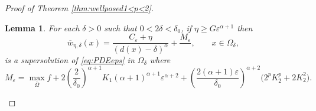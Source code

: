 \documentclass[11pt,reqno]{amsart}
\numberwithin{figure}{section}
\theoremstyle{plain}
\newtheorem{lem}[thm]{Lemma}
\theoremstyle{remark}
\numberwithin{equation}{section}
\begin{document}
\begin{appendices}
\begin{proof} [Proof of Theorem \ref{thm:wellposed1<p<2}]
\begin{lem}\label{lem:subsln} For each $\delta > 0$ such that $0<2\delta < \delta_0$, if $\eta\geq G\varepsilon^{\alpha+1}$ then
\begin{equation*}
    \overline{w}_{\eta,\delta}(x) = \frac{C_\varepsilon+\eta}{(d(x)-\delta)^\alpha} +\frac{M_\varepsilon}{ },\qquad x\in \Omega_\delta, 
\end{equation*}
is a supersolution of \eqref{eq:PDEeps} in $\Omega_\delta$ where
\begin{equation}\label{e:M_eps}
    M_\varepsilon = \max_{\overline{\Omega}} f + 2\left(\frac{2}{\delta_0}\right)^{\alpha+1}K_1(\alpha+1)^{\alpha+1}\varepsilon^{\alpha+2} + \left(\frac{2(\alpha+1)\varepsilon}{\delta_0}\right)^{\alpha+2}\big(2^pK_2^p+2K_2^2\big).
\end{equation}
\end{lem}


\end{proof}
\end{appendices}
\end{document}
